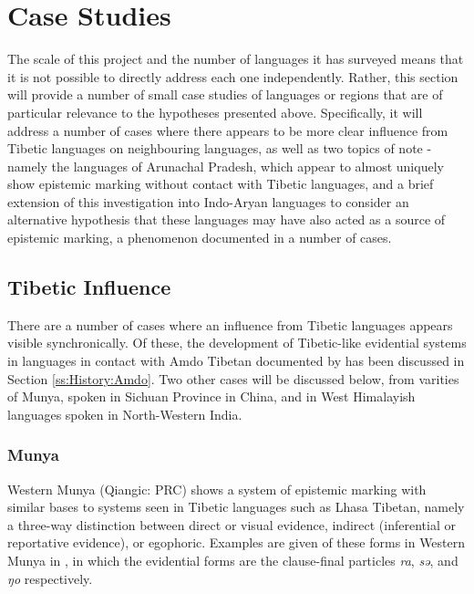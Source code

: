 \section{Case Studies}\label{s:History:CaseStudies}
The scale of this project and the number of languages it has surveyed means that it is not possible to directly address each one independently. Rather, this section will provide a number of small case studies of languages or regions that are of particular relevance to the hypotheses presented above. Specifically, it will address a number of cases where there appears to be more clear influence from Tibetic languages on neighbouring languages, as well as two topics of note - namely the languages of Arunachal Pradesh, which appear to almost uniquely show epistemic marking without contact with Tibetic languages, and a brief extension of this investigation into Indo-Aryan languages to consider an alternative hypothesis that these languages may have also acted as a source of epistemic marking, a phenomenon documented in a number of cases.
\subsection{Tibetic Influence}\label{ss:History:TibeticInfluence}
There are a number of cases where an influence from Tibetic languages appears visible synchronically. Of these, the development of Tibetic-like evidential systems in languages in contact with Amdo Tibetan documented by  has been discussed in Section \ref{ss:History:Amdo}. Two other cases will be discussed below, from varities of Munya, spoken in Sichuan Province in China, and in West Himalayish languages spoken in North-Western India.
\subsubsection{Munya}\label{sss:History:Munya}
Western Munya (Qiangic: PRC) shows a system of epistemic marking with similar bases to systems seen in Tibetic languages such as Lhasa Tibetan, namely a three-way distinction between direct or visual evidence, indirect (inferential or reportative evidence), or egophoric. Examples are given of these forms in Western Munya in , in which the evidential forms are the clause-final particles \textit{ra}, \textit{sə}, and \textit{ŋo} respectively.

